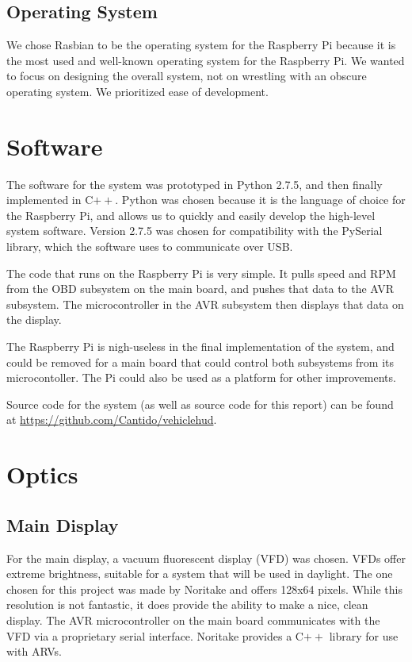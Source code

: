 \subsection{Operating System}
We chose Rasbian to be the operating system for the Raspberry Pi because it is the
most used and well-known operating system for the Raspberry Pi. We wanted to focus
on designing the overall
system, not on wrestling with an obscure operating system. We prioritized ease
of development.

\section{Software}
The software for the system was prototyped in Python 2.7.5, and then finally
implemented in C$++$. Python was chosen
because it is the language of choice for the Raspberry Pi, and allows us to
quickly and easily develop the high-level system software. Version 2.7.5 was
chosen for compatibility with the PySerial library, which the software uses to
communicate over USB.

The code that runs on the Raspberry Pi is very simple. It pulls speed and RPM
from the OBD subsystem on the main board, and pushes that data to the AVR
subsystem. The microcontroller in the AVR subsystem then displays that data
on the display.

The Raspberry Pi is nigh-useless in the final implementation of the system, and
could be removed for a main board that could control both subsystems from its
microcontoller. The Pi could also be used as a platform for other improvements.

Source code for the system (as well as source code for this report) can be
found at \url{https://github.com/Cantido/vehiclehud}.

\section{Optics}
\subsection{Main Display}
For the main display, a vacuum fluorescent display (VFD) was chosen.  VFDs offer
extreme brightness, suitable for a system that will be used in daylight.  The
one chosen for this project was made by Noritake and offers 128x64 pixels.  
While this resolution is not fantastic, it does provide the ability to make a
nice, clean display.  The AVR microcontroller on the main board communicates 
with the VFD via a proprietary serial interface.  Noritake provides a C$++$ 
library for use with ARVs.

